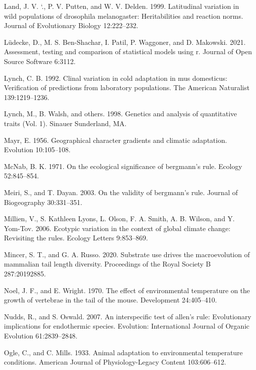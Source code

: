 \documentclass[]{article}
\begin{document}
\leavevmode\hypertarget{ref-Land1999}{}%
Land, J. V. `., P. V. Putten, and W. V. Delden. 1999. Latitudinal
variation in wild populations of drosophila melanogaster: Heritabilities
and reaction norms. Journal of Evolutionary Biology 12:222--232.

\leavevmode\hypertarget{ref-Luxfcdecke2021}{}%
Lüdecke, D., M. S. Ben-Shachar, I. Patil, P. Waggoner, and D. Makowski.
2021. Assessment, testing and comparison of statistical models using r.
Journal of Open Source Software 6:3112.

\leavevmode\hypertarget{ref-Lynch1992}{}%
Lynch, C. B. 1992. Clinal variation in cold adaptation in mus
domesticus: Verification of predictions from laboratory populations. The
American Naturalist 139:1219--1236.

\leavevmode\hypertarget{ref-Lynch1998}{}%
Lynch, M., B. Walsh, and others. 1998. Genetics and analysis of
quantitative traits (Vol. 1). Sinauer Sunderland, MA.

\leavevmode\hypertarget{ref-Mayr1956}{}%
Mayr, E. 1956. Geographical character gradients and climatic adaptation.
Evolution 10:105--108.

\leavevmode\hypertarget{ref-McNab1971}{}%
McNab, B. K. 1971. On the ecological significance of bergmann's rule.
Ecology 52:845--854.

\leavevmode\hypertarget{ref-Meiri2003}{}%
Meiri, S., and T. Dayan. 2003. On the validity of bergmann's rule.
Journal of Biogeography 30:331--351.

\leavevmode\hypertarget{ref-Millien2006}{}%
Millien, V., S. Kathleen Lyons, L. Olson, F. A. Smith, A. B. Wilson, and
Y. Yom-Tov. 2006. Ecotypic variation in the context of global climate
change: Revisiting the rules. Ecology Letters 9:853--869.

\leavevmode\hypertarget{ref-Mincer2020}{}%
Mincer, S. T., and G. A. Russo. 2020. Substrate use drives the
macroevolution of mammalian tail length diversity. Proceedings of the
Royal Society B 287:20192885.

\leavevmode\hypertarget{ref-Noel1970}{}%
Noel, J. F., and E. Wright. 1970. The effect of environmental
temperature on the growth of vertebrae in the tail of the mouse.
Development 24:405--410.

\leavevmode\hypertarget{ref-Nudds2007}{}%
Nudds, R., and S. Oswald. 2007. An interspecific test of allen's rule:
Evolutionary implications for endothermic species. Evolution:
International Journal of Organic Evolution 61:2839--2848.

\leavevmode\hypertarget{ref-Ogle1933}{}%
Ogle, C., and C. Mills. 1933. Animal adaptation to environmental
temperature conditions. American Journal of Physiology-Legacy Content
103:606--612.
\end{document}
